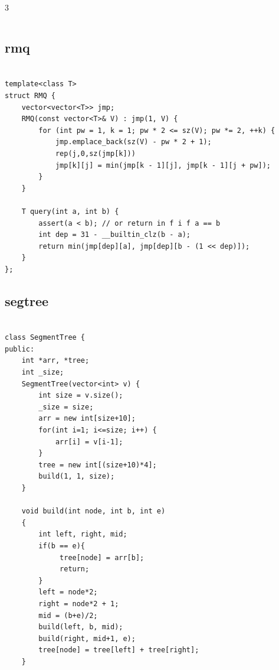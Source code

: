 \documentclass[twoside]{article}
\begin{document}
\begin{multicols*}{3}
\begin{verbatim}
\end{verbatim}

{
\subsection*{rmq}
}
\begin{verbatim}

template<class T>
struct RMQ {
    vector<vector<T>> jmp;
    RMQ(const vector<T>& V) : jmp(1, V) {
        for (int pw = 1, k = 1; pw * 2 <= sz(V); pw *= 2, ++k) {
            jmp.emplace_back(sz(V) - pw * 2 + 1);
            rep(j,0,sz(jmp[k]))
            jmp[k][j] = min(jmp[k - 1][j], jmp[k - 1][j + pw]);
        }
    }

    T query(int a, int b) {
        assert(a < b); // or return in f i f a == b
        int dep = 31 - __builtin_clz(b - a);
        return min(jmp[dep][a], jmp[dep][b - (1 << dep)]);
    }
};

\end{verbatim}

{
\subsection*{segtree}
}
\begin{verbatim}

class SegmentTree {
public:
    int *arr, *tree;
    int _size;
    SegmentTree(vector<int> v) {
        int size = v.size();
        _size = size;
        arr = new int[size+10];
        for(int i=1; i<=size; i++) {
            arr[i] = v[i-1];
        }
        tree = new int[(size+10)*4];
        build(1, 1, size);
    }

    void build(int node, int b, int e)
    {
        int left, right, mid;
        if(b == e){
             tree[node] = arr[b];
             return;
        }
        left = node*2;
        right = node*2 + 1;
        mid = (b+e)/2;
        build(left, b, mid);
        build(right, mid+1, e);
        tree[node] = tree[left] + tree[right];
    }


\end{verbatim}
\end{multicols*}
\end{document}
